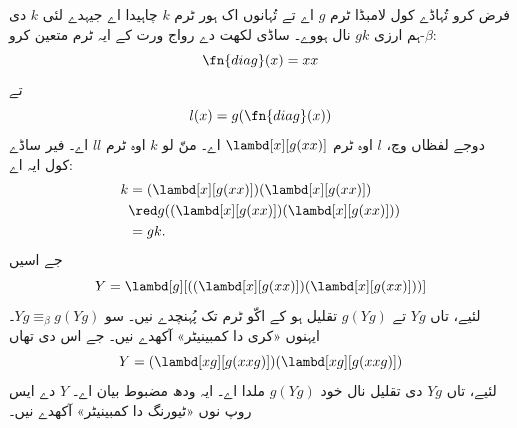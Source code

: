 \documentclass[../../../include/open-logic-section]{subfiles}
\begin{document}

فرض کرو تُہاڈے کول لامبڈا ٹرم $g$ اے تے تُہانوں اک ہور ٹرم $k$
چاہیدا اے جیہدے لئی $k$ دی $\beta$-ہم ارزی $gk$ نال ہووے۔
ساڈی لکھت دے رواج ورت کے ایہ ٹرم متعین کرو:
\[
\fn{diag}(x) = xx
\]
تے
\[
l(x) = g(\fn{diag}(x))
\]
دوجے لفظاں وچ، $l$ اوہ ٹرم $\lambd[x][g(xx)]$ اے۔ منّ لو $k$
اوہ ٹرم $ll$ اے۔ فیر ساڈے کول ایہ اے:
\begin{align*}
k & = (\lambd[x][g(xx)])(\lambd[x][g(xx)]) \\
& \red  g((\lambd[x][g(xx)])(\lambd[x][g(xx)])) \\
& = gk.
\end{align*}
جے اسیں
\[
Y = \lambd[g][((\lambd[x][g(xx)])(\lambd[x][g(xx)]))]
\]
لئیے، تاں $Yg$ تے $g(Yg)$ تقلیل ہو کے اکّو ٹرم تک پُہنچدے نیں۔
سو $Yg \equiv_\beta g(Yg)$۔ ایہنوں «کری دا کمبینیٹر» آکھدے نیں۔
جے اس دی تھاں
\[
Y = (\lambd[xg][g(xxg)])(\lambd[xg][g(xxg)])
\]
لئیے، تاں $Yg$ دی تقلیل نال خود $g(Yg)$ ملدا اے۔ ایہ ودھ مضبوط
بیان اے۔ $Y$ دے ایس روپ نوں «ٹیورنگ دا کمبینیٹر» آکھدے نیں۔
\end{document}
